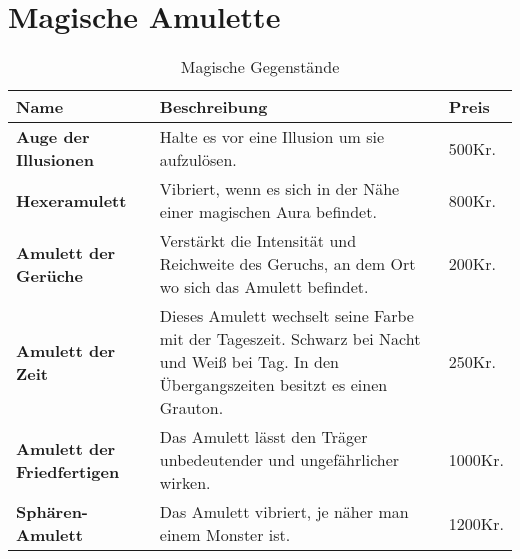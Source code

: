 \section{Magische Amulette}
\begin{table}[h]
\begin{center}
\begin{tabular}{|p{4cm}|p{10cm}|p{1cm}|}
\hline
\textbf{Name} & \textbf{Beschreibung} & \textbf{Preis} \\

\hline
\textbf{Auge der Illusionen} & Halte es vor eine Illusion um sie aufzulösen. & 500Kr. \\

\hline
\textbf{Hexeramulett} & Vibriert, wenn es sich in der Nähe einer magischen Aura befindet. & 800Kr. \\

\hline
\textbf{Amulett der Gerüche} & Verstärkt die Intensität und Reichweite des Geruchs, an dem Ort wo sich das Amulett befindet. & 200Kr. \\ 

\hline
\textbf{Amulett der Zeit} & Dieses Amulett wechselt seine Farbe mit der Tageszeit. Schwarz bei Nacht und Weiß bei Tag. In den Übergangszeiten besitzt es einen Grauton. & 250Kr. \\

\hline
\textbf{Amulett der Friedfertigen} & Das Amulett lässt den Träger unbedeutender und ungefährlicher wirken. & 1000Kr. \\ 

\hline
\textbf{Sphären-Amulett} & Das Amulett vibriert, je näher man einem Monster ist. & 1200Kr. \\

\hline
\end{tabular}
\end{center}
\caption{Magische Gegenstände}
\label{tab:MagischeGegenstände}
\end{table}